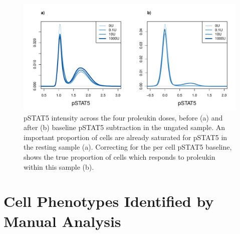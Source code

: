 \hspace{-2cm}
\begin{figure}[h]
\centering
\includegraphics[scale=.5]{IL2/figures/pstat5-baseline-relative.pdf}
{ pSTAT5 intensity across the four proleukin doses, before (a) and after (b) baseline pSTAT5 subtraction in the ungated sample.}
{
  An important proportion of cells are already saturated for pSTAT5 in the resting sample (a).
  Correcting for the per cell pSTAT5 baseline, shows the true proportion of cells which responds to proleukin within this sample (b).
}
\end{figure}




\section{Cell Phenotypes Identified by Manual Analysis}


